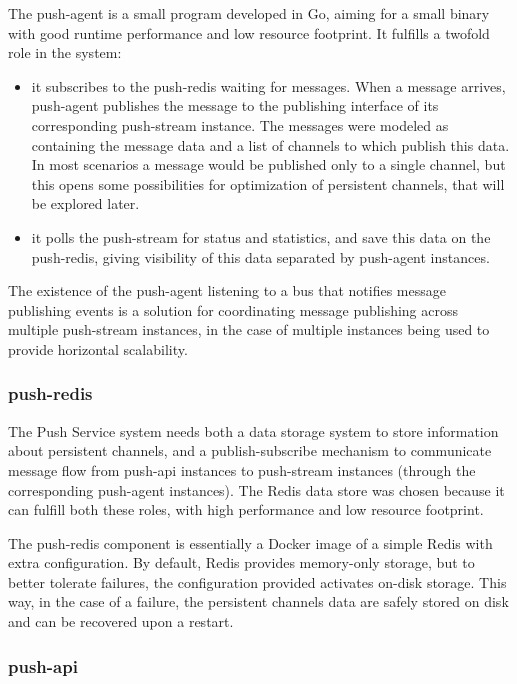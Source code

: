 The push-agent is a small program developed in Go, aiming for a small binary with good runtime performance and low resource footprint. It fulfills a twofold role in the system:
\begin{itemize}
    \item it subscribes to the push-redis waiting for messages. When a message arrives, push-agent publishes the message to the publishing interface of its corresponding push-stream instance. The messages were modeled as containing the message data and a list of channels to which publish this data. In most scenarios a message would be published only to a single channel, but this opens some possibilities for optimization of persistent channels, that will be explored later.
    \item it polls the push-stream for status and statistics, and save this data on the push-redis, giving visibility of this data separated by push-agent instances.
\end{itemize}

The existence of the push-agent listening to a bus that notifies message publishing events is a solution for coordinating message publishing across multiple push-stream instances, in the case of multiple instances being used to provide horizontal scalability.


\subsubsection{push-redis}

The Push Service system needs both a data storage system to store information about persistent channels, and a publish-subscribe mechanism to communicate message flow from push-api instances to push-stream instances (through the corresponding push-agent instances). The Redis data store was chosen because it can fulfill both these roles, with high performance and low resource footprint.

The push-redis component is essentially a Docker image of a simple Redis with extra configuration. By default, Redis provides memory-only storage, but to better tolerate failures, the configuration provided activates on-disk storage. This way, in the case of a failure, the persistent channels data are safely stored on disk and can be recovered upon a restart.


\subsubsection{push-api}

